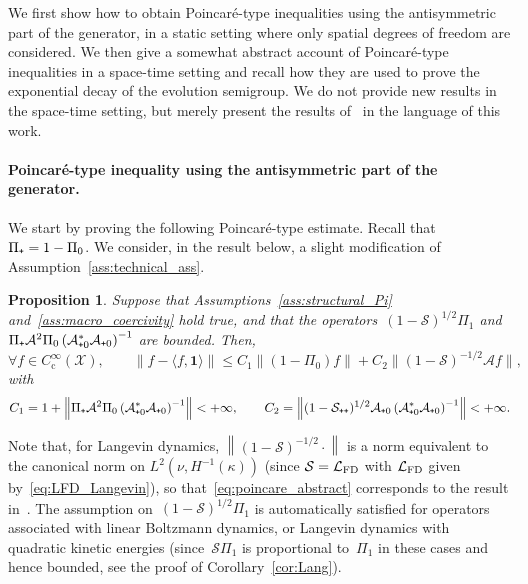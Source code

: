 \documentclass{article}
\newtheorem{prop}{Proposition}
\newcommand{\cLs}{\mathcal{S}}
\newcommand{\cLa}{\mathcal{A}}
\newcommand{\cLFD}{\mathcal{L}_{\rm FD}}
\newcommand{\cX}{\mathcal{X}}
\newcommand{\subplus}{\textnormal{\texttt{+}}}
\renewcommand{\leq}{\leqslant}
\begin{document}
We first show how to obtain Poincar\'e-type inequalities using the antisymmetric part of the generator, in a static setting where only spatial degrees of freedom are considered. We then give a somewhat abstract account of Poincar\'e-type inequalities in a space-time setting and recall how they are used to prove the exponential decay of the evolution semigroup. We do not provide new results in the space-time setting, but merely present the results of~\cite{AM19,CLW19} in the language of this work.

\paragraph{Poincar\'e-type inequality using the antisymmetric part of the generator.}
We start by proving the following Poincar\'e-type estimate. Recall that $\Pi_\subplus = 1-\Pi_0$. We consider, in the result below, a slight modification of Assumption~\ref{ass:technical_ass}. 

\begin{prop}
\label{prop:Poincare_static}
  Suppose that Assumptions~\ref{ass:structural_Pi} and~\ref{ass:macro_coercivity} hold true, and that the operators~$(1-\cLs)^{1/2} \Pi_{1}$ and~$\Pi_\subplus \cLa^2 \Pi_0 \left(\cLa_{\subplus 0}^*\cLa_{\subplus 0}\right)^{-1}$ are bounded. Then, 
  \begin{equation}
    \label{eq:poincare_abstract}
    \forall f \in C_\mathrm{c}^\infty(\cX), \qquad \left\| f - \langle f,\mathbf{1}\rangle \right\| \leq C_1 \| (1-\Pi_0)f \| + C_2 \| (1-\cLs)^{-1/2} \cLa f \|,
  \end{equation}
  with 
  \begin{equation}
    \label{eq:expression_C1_C2}
    C_1 = 1+\left\|\Pi_\subplus \cLa^2 \Pi_0 \left(\cLa_{\subplus 0}^*\cLa_{\subplus 0}\right)^{-1}\right\| < +\infty,
    \qquad
    C_2 = \left\| (1-\cLs_{\subplus\subplus})^{1/2} \cLa_{\subplus 0}\left(\cLa_{\subplus 0}^*\cLa_{\subplus 0}\right)^{-1} \right\| < +\infty.
  \end{equation}
\end{prop}

Note that, for Langevin dynamics, $\left\| (1-\cLs)^{-1/2} \cdot \right\|$ is a norm equivalent to the canonical norm on $L^2(\nu,H^{-1}(\kappa))$ (since $\cLs = \cLFD$ with $\cLFD$ given by~\eqref{eq:LFD_Langevin}), so that~\eqref{eq:poincare_abstract} corresponds to the result in~\cite[Theorem~1.2]{AM19}. The assumption on~$(1-\cLs)^{1/2} \Pi_{1}$ is automatically satisfied for operators associated with linear Boltzmann dynamics, or Langevin dynamics with quadratic kinetic energies (since~$\cLs \Pi_1$ is proportional to~$\Pi_1$ in these cases and hence bounded, see the proof of Corollary~\ref{cor:Lang}).
\end{document}
